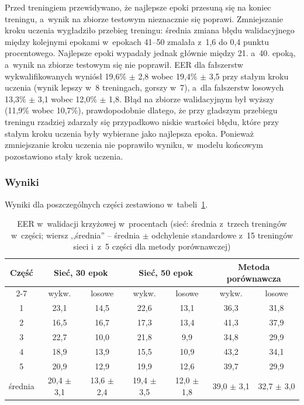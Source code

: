 \documentclass[12pt, twoside, openright]{article}
\begin{document}
Przed treningiem przewidywano, że najlepsze epoki przesuną się na koniec treningu, a~wynik na zbiorze testowym nieznacznie się poprawi.
Zmniejszanie kroku uczenia wygładziło przebieg treningu: średnia zmiana błędu walidacyjnego między kolejnymi epokami w~epokach 41--50 zmalała z~1,6 do 0,4 punktu procentowego.
Najlepsze epoki wypadały jednak głównie między 21. a~40. epoką, a~wynik na zbiorze testowym się nie poprawił.
EER dla fałszerstw wykwalifikowanych wyniósł 19,6\% $\pm$ 2,8 wobec 19,4\% $\pm$ 3,5 przy stałym kroku uczenia (wynik lepszy w~8 treningach, gorszy w~7), a~dla fałszerstw losowych 13,3\% $\pm$ 3,1 wobec 12,0\% $\pm$ 1,8.
Błąd na zbiorze walidacyjnym był wyższy (11,9\% wobec 10,7\%), prawdopodobnie dlatego, że przy gładszym przebiegu treningu rzadziej zdarzały się przypadkowo niskie wartości błędu, które przy stałym kroku uczenia były wybierane jako najlepsza epoka.
Ponieważ zmniejszanie kroku uczenia nie poprawiło wyniku, w~modelu końcowym pozostawiono stały krok uczenia.

\subsubsection*{Wyniki}

Wyniki dla poszczególnych części zestawiono w~tabeli~\ref{Tab:cv}.

\begin{table}[ht]
\caption{EER w~walidacji krzyżowej w~procentach (sieć: średnia z~trzech treningów w~części; wiersz ,,średnia'' -- średnia $\pm$ odchylenie standardowe z~15 treningów sieci i~z~5 części dla metody porównawczej)}
\centering
	\begin{tabular}{|c|c|c|c|c|c|c|}
		\hline
		\multirow{2}{*}{Część} & \multicolumn{2}{c|}{Sieć, 30 epok} & \multicolumn{2}{c|}{Sieć, 50 epok} & \multicolumn{2}{c|}{Metoda porównawcza} \\
		\cline{2-7}
		& wykw. & losowe & wykw. & losowe & wykw. & losowe \\
		\hline
		1 & 23,1 & 14,5 & 22,6 & 13,1 & 36,3 & 31,8 \\
		2 & 16,5 & 16,7 & 17,3 & 13,4 & 41,3 & 37,9 \\
		3 & 22,7 & 10,0 & 21,8 & 9,9 & 34,8 & 29,9 \\
		4 & 18,9 & 13,9 & 15,5 & 10,9 & 43,2 & 34,1 \\
		5 & 20,9 & 12,9 & 19,9 & 12,6 & 39,7 & 29,9 \\
		\hline
		średnia & 20,4 $\pm$ 3,1 & 13,6 $\pm$ 2,4 & 19,4 $\pm$ 3,5 & 12,0 $\pm$ 1,8 & 39,0 $\pm$ 3,1 & 32,7 $\pm$ 3,0 \\
		\hline
	\end{tabular}
\label{Tab:cv}
\end{table}
\end{document}
